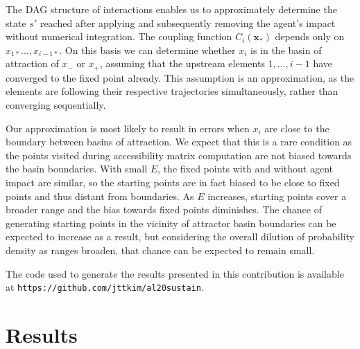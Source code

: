 \documentclass[conference]{IEEEtran}
\newcommand{\vectorsym}[1]{\ensuremath{\mathbf{#1}}}
\newcommand{\couplingfunction}{\ensuremath{C}}
\newcommand{\impactstrength}{\ensuremath{E}}
\begin{document}
The DAG structure of interactions enables us to approximately
determine the state $s'$ reached after applying and subsequently
removing the agent's impact without numerical integration. The
coupling function $\couplingfunction_i(\vectorsym{x}_*)$ depends only
on $x_{1*} \ldots, x_{i-1*}$. On this basis we can determine whether
$x_i$ is in the basin of attraction of $x_{-}$ or $x_{+}$, assuming
that the upstream elements $1, \ldots, i - 1$ have converged to the
fixed point already. This assumption is an approximation, as the
elements are following their respective trajectories simultaneously,
rather than converging sequentially.

Our approximation is most likely to result in errors when $x_i$ are
close to the boundary between basins of attraction. We expect that
this is a rare condition as the points visited during accessibility
matrix computation are not biased towards the basin boundaries. With
small $\impactstrength$, the fixed points with and without agent impact are similar,
so the starting points are in fact biased to be close to fixed points
and thus distant from boundaries. As $\impactstrength$ increases, starting points
cover a broader range and the bias towards fixed points diminishes.
The chance of generating starting points in the vicinity of attractor
basin boundaries can be expected to increase as a result, but
considering the overall dilution of probability density as ranges
broaden, that chance can be expected to remain small.

The code used to generate the results presented in this contribution
is available at \texttt{https://github.com/jttkim/al20sustain}.


\section{Results}
\end{document}
